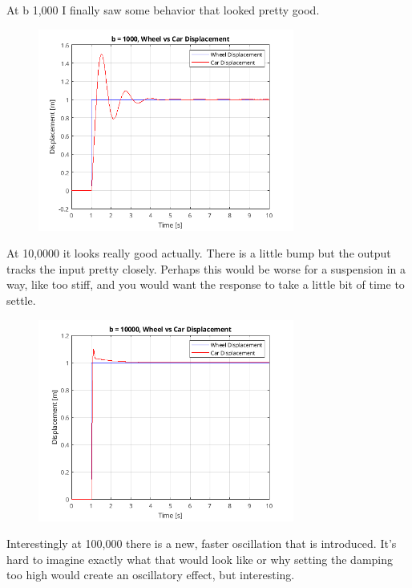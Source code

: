 \documentclass{article}
\begin{document}
At b 1,000 I finally saw some behavior that looked pretty good.

\begin{figure}[H]
    \centering
    \includegraphics[width=0.75\textwidth]{b1000sim.png}
\end{figure}

At 10,0000 it looks really good actually.
There is a little bump but the output tracks the input pretty closely.
Perhaps this would be worse for a suspension in a way, like too stiff, and you would want the response to take a little bit of time to settle.

\begin{figure}[H]
    \centering
    \includegraphics[width=0.75\textwidth]{b10000sim.png}
\end{figure}

Interestingly at 100,000 there is a new, faster oscillation that is introduced.
It's hard to imagine exactly what that would look like or why setting the damping too high would create an oscillatory effect, but interesting.
\end{document}
